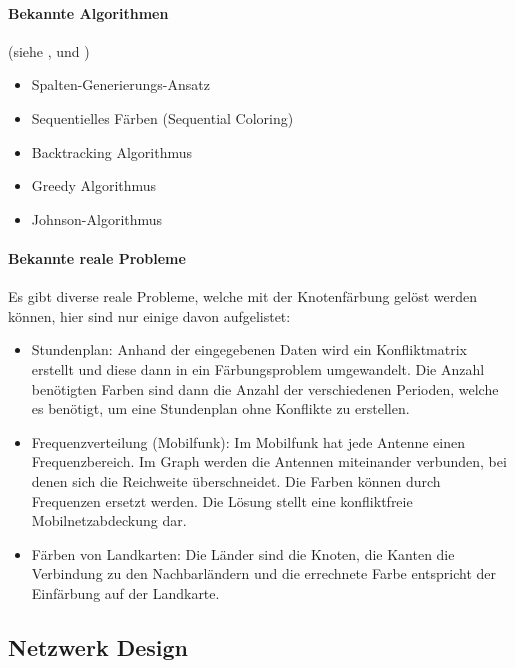 	\paragraph{Bekannte Algorithmen}
	(siehe \cite{seminar_algo_graph}, \cite{krumke2012graphentheoretische} und \cite{seminar_rob_graphen})
	\begin{itemize}
		\item Spalten-Generierungs-Ansatz
		\item Sequentielles Färben (Sequential Coloring)
		\item Backtracking Algorithmus
		\item Greedy Algorithmus
		\item Johnson-Algorithmus
	\end{itemize}	

	\paragraph{Bekannte reale Probleme}	
	Es gibt diverse reale Probleme, welche mit der Knotenfärbung gelöst werden können, hier sind nur einige davon aufgelistet:
	\begin{itemize}
		\item Stundenplan: Anhand der eingegebenen Daten wird ein Konfliktmatrix erstellt und diese dann in ein Färbungsproblem umgewandelt. Die Anzahl benötigten Farben sind dann 
			die Anzahl der verschiedenen Perioden, welche es benötigt, um eine Stundenplan ohne Konflikte zu erstellen. \cite{ieee_exam_table_graph_coloring} \cite{time_table_graph_coloring} \cite{timetabling_abdullah}
		\item Frequenzverteilung (Mobilfunk): Im Mobilfunk hat jede Antenne einen Frequenzbereich. Im Graph werden die Antennen miteinander verbunden, bei denen sich die 
			Reichweite überschneidet. Die Farben können durch Frequenzen ersetzt werden. Die Lösung stellt eine konfliktfreie Mobilnetzabdeckung dar. \cite{seminar_rob_graphen}
		\item Färben von Landkarten: Die Länder sind die Knoten, die Kanten die Verbindung zu den Nachbarländern und die errechnete Farbe entspricht der Einfärbung auf der Landkarte. 
			\cite{seminar_rob_graphen}
	\end{itemize}

\newpage
\subsection{Netzwerk Design}\label{network_design}

